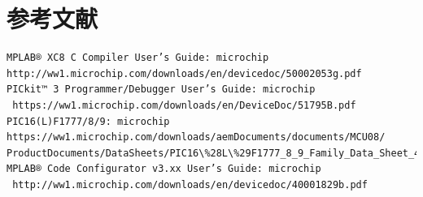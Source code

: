 \documentclass[
]{ltjarticle}
\begin{document}
\section*{参考文献}
\begin{verbatim}
MPLAB® XC8 C Compiler User’s Guide: microchip 
http://ww1.microchip.com/downloads/en/devicedoc/50002053g.pdf
PICkit™ 3 Programmer/Debugger User’s Guide: microchip
 https://ww1.microchip.com/downloads/en/DeviceDoc/51795B.pdf
PIC16(L)F1777/8/9: microchip https://ww1.microchip.com/downloads/aemDocuments/documents/MCU08/
ProductDocuments/DataSheets/PIC16\%28L\%29F1777_8_9_Family_Data_Sheet_40001819D.pdf 
MPLAB® Code Configurator v3.xx User’s Guide: microchip
 http://ww1.microchip.com/downloads/en/devicedoc/40001829b.pdf
\end{verbatim}
\end{document}
